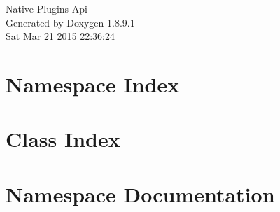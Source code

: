 \documentclass[twoside]{book}
\newcommand{\+}{\discretionary{\mbox{\scriptsize$\hookleftarrow$}}{}{}}
\newcommand{\clearemptydoublepage}{%
  \newpage{\pagestyle{empty}\cleardoublepage}%
}
\begin{document}
\hypersetup{pageanchor=false,
             bookmarks=true,
             bookmarksnumbered=true,
             pdfencoding=unicode
            }
\begin{titlepage}
\vspace*{7cm}
\begin{center}%
{\Large Native Plugins Api }\\
\vspace*{1cm}
{\large Generated by Doxygen 1.8.9.1}\\
\vspace*{0.5cm}
{\small Sat Mar 21 2015 22:36:24}\\
\end{center}
\end{titlepage}
\clearemptydoublepage
\tableofcontents
\clearemptydoublepage
{}
\hypersetup{pageanchor=true}

\chapter{Namespace Index}

\chapter{Class Index}

\chapter{Namespace Documentation}



\end{document}
